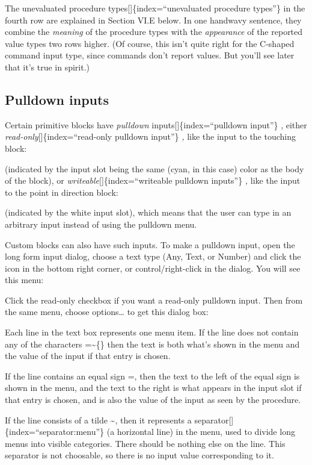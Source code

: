 \documentclass[
  letterpaper,
]{book}
\begin{document}
The unevaluated procedure types{[}{]}\{index=``unevaluated procedure
types''\} in the fourth row are explained in Section VI.E below. In one
handwavy sentence, they combine the \emph{meaning} of the procedure
types with the \emph{appearance} of the reported value types two rows
higher. (Of course, this isn't quite right for the C-shaped command
input type, since commands don't report values. But you'll see later
that it's true in spirit.)

\subsection{Pulldown inputs}\label{pulldown-inputs}

Certain primitive blocks have \emph{pulldown}
inputs{[}{]}\{index=``pulldown input''\} , either
\emph{read-only}{[}{]}\{index=``read-only pulldown input''\} \emph{,}
like the input to the touching block:

(indicated by the input slot being the same (cyan, in this case) color
as the body of the block), or \emph{writeable}{[}{]}\{index=``writeable
pulldown inputs''\} \emph{,} like the input to the point in direction
block:

(indicated by the white input slot), which means that the user can type
in an arbitrary input instead of using the pulldown menu.

Custom blocks can also have such inputs. To make a pulldown input, open
the long form input dialog, choose a text type (Any, Text, or Number)
and click the icon in the bottom right corner, or control/right-click in
the dialog. You will see this menu:

Click the read-only checkbox if you want a read-only pulldown input.
Then from the same menu, choose options\ldots{} to get this dialog box:

Each line in the text box represents one menu item. If the line does not
contain any of the characters =\textasciitilde\{\} then the text is both
what's shown in the menu and the value of the input if that entry is
chosen.

If the line contains an equal sign =, then the text to the left of the
equal sign is shown in the menu, and the text to the right is what
appears in the input slot if that entry is chosen, and is also the value
of the input as seen by the procedure.

If the line consists of a tilde \textasciitilde, then it represents a
separator{[}{]}\{index=``separator:menu''\} (a horizontal line) in the
menu, used to divide long menus into visible categories. There should be
nothing else on the line. This separator is not choosable, so there is
no input value corresponding to it.
\end{document}
